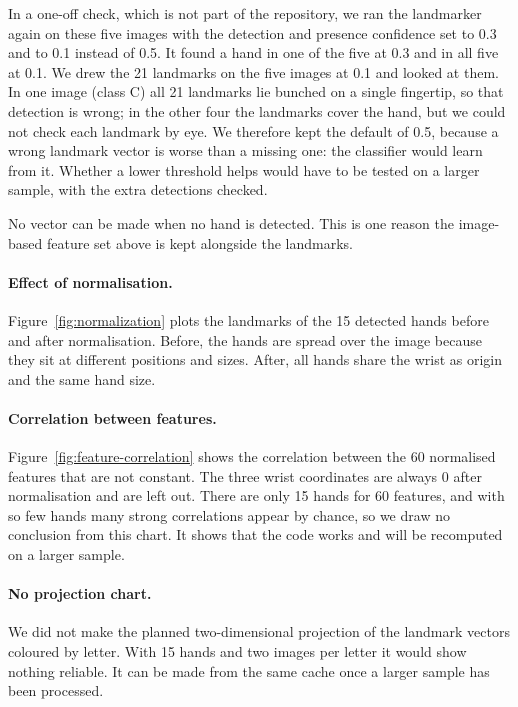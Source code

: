In a one-off check, which is not part of the repository, we ran the landmarker again on these five images with the detection and presence confidence set to 0.3 and to 0.1 instead of 0.5. It found a hand in one of the five at 0.3 and in all five at 0.1. We drew the 21 landmarks on the five images at 0.1 and looked at them. In one image (class C) all 21 landmarks lie bunched on a single fingertip, so that detection is wrong; in the other four the landmarks cover the hand, but we could not check each landmark by eye. We therefore kept the default of 0.5, because a wrong landmark vector is worse than a missing one: the classifier would learn from it. Whether a lower threshold helps would have to be tested on a larger sample, with the extra detections checked.

No vector can be made when no hand is detected. This is one reason the image-based feature set above is kept alongside the landmarks.

\paragraph{Effect of normalisation.} Figure~\ref{fig:normalization} plots the landmarks of the 15 detected hands before and after normalisation. Before, the hands are spread over the image because they sit at different positions and sizes. After, all hands share the wrist as origin and the same hand size.


\paragraph{Correlation between features.} Figure~\ref{fig:feature-correlation} shows the correlation between the 60 normalised features that are not constant. The three wrist coordinates are always 0 after normalisation and are left out. There are only 15 hands for 60 features, and with so few hands many strong correlations appear by chance, so we draw no conclusion from this chart. It shows that the code works and will be recomputed on a larger sample.


\paragraph{No projection chart.} We did not make the planned two-dimensional projection of the landmark vectors coloured by letter. With 15 hands and two images per letter it would show nothing reliable. It can be made from the same cache once a larger sample has been processed.

